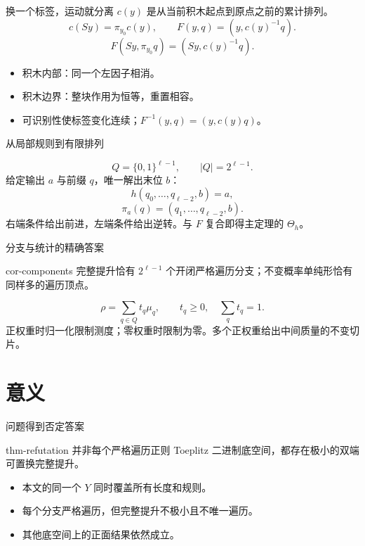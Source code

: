 \documentclass{beamer}
\begin{document}
\begin{frame}{换一个标签，运动就分离}
$c(y)$ 是从当前积木起点到原点之前的累计排列。
\[
c(Sy)=\pi_{y_0}c(y),\qquad F(y,q)=(y,c(y)^{-1}q).
\]
\[
F(Sy,\pi_{y_0}q)=(Sy,c(y)^{-1}q).
\]
\begin{itemize}
\item 积木内部：同一个左因子相消。
\item 积木边界：整块作用为恒等，重置相容。
\item 可识别性使标签变化连续；$F^{-1}(y,q)=(y,c(y)q)$。
\end{itemize}
\end{frame}

\begin{frame}{从局部规则到有限排列}

\[
Q=\{0,1\}^{\ell-1},\qquad |Q|=2^{\ell-1}.
\]
给定输出 $a$ 与前缀 $q$，唯一解出末位 $b$：
\[
h(q_0,\ldots,q_{\ell-2},b)=a,
\]
\[
\pi_a(q)=(q_1,\ldots,q_{\ell-2},b).
\]
右端条件给出前进，左端条件给出逆转。与 $F$ 复合即得主定理的 $\Theta_h$。
\end{frame}

\begin{frame}{分支与统计的精确答案}

\begin{bookresult}{cor-components}
完整提升恰有 $2^{\ell-1}$ 个开闭严格遍历分支；不变概率单纯形恰有同样多的遍历顶点。
\end{bookresult}
\[
\rho=\sum_{q\in Q}t_q\mu_q,\qquad t_q\geq0,\quad\sum_qt_q=1.
\]
正权重时归一化限制测度；零权重时限制为零。多个正权重给出中间质量的不变切片。
\end{frame}

\section{意义}

\begin{frame}{问题得到否定答案}

\begin{bookresult}{thm-refutation}
并非每个严格遍历正则 Toeplitz 二进制底空间，都存在极小的双端可置换完整提升。
\end{bookresult}
\begin{itemize}
\item 本文的同一个 $Y$ 同时覆盖所有长度和规则。
\item 每个分支严格遍历，但完整提升不极小且不唯一遍历。
\item 其他底空间上的正面结果依然成立。
\end{itemize}
\end{frame}
\end{document}
